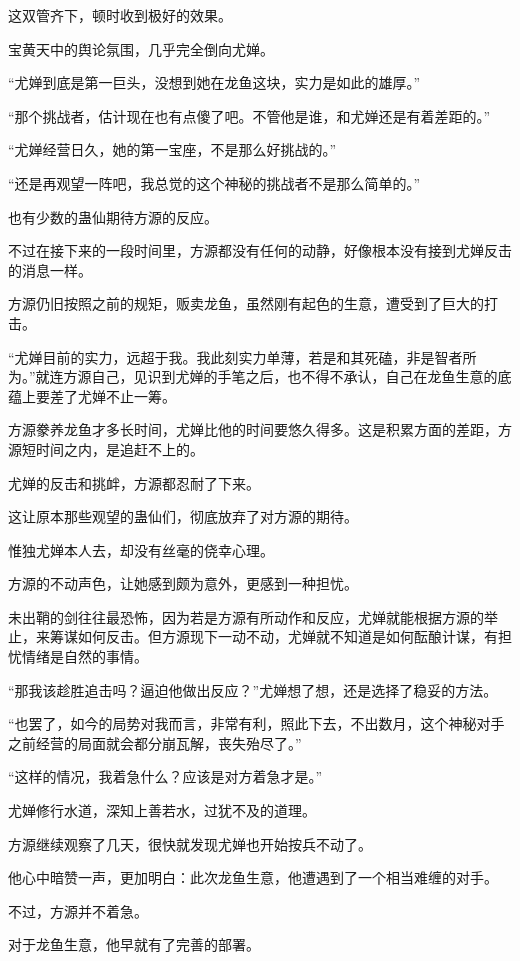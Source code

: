 \begin{this_body}
这双管齐下，顿时收到极好的效果。

宝黄天中的舆论氛围，几乎完全倒向尤婵。

“尤婵到底是第一巨头，没想到她在龙鱼这块，实力是如此的雄厚。”

“那个挑战者，估计现在也有点傻了吧。不管他是谁，和尤婵还是有着差距的。”

“尤婵经营日久，她的第一宝座，不是那么好挑战的。”

“还是再观望一阵吧，我总觉的这个神秘的挑战者不是那么简单的。”

也有少数的蛊仙期待方源的反应。

不过在接下来的一段时间里，方源都没有任何的动静，好像根本没有接到尤婵反击的消息一样。

方源仍旧按照之前的规矩，贩卖龙鱼，虽然刚有起色的生意，遭受到了巨大的打击。

“尤婵目前的实力，远超于我。我此刻实力单薄，若是和其死磕，非是智者所为。”就连方源自己，见识到尤婵的手笔之后，也不得不承认，自己在龙鱼生意的底蕴上要差了尤婵不止一筹。

方源豢养龙鱼才多长时间，尤婵比他的时间要悠久得多。这是积累方面的差距，方源短时间之内，是追赶不上的。

尤婵的反击和挑衅，方源都忍耐了下来。

这让原本那些观望的蛊仙们，彻底放弃了对方源的期待。

惟独尤婵本人去，却没有丝毫的侥幸心理。

方源的不动声色，让她感到颇为意外，更感到一种担忧。

未出鞘的剑往往最恐怖，因为若是方源有所动作和反应，尤婵就能根据方源的举止，来筹谋如何反击。但方源现下一动不动，尤婵就不知道是如何酝酿计谋，有担忧情绪是自然的事情。

“那我该趁胜追击吗？逼迫他做出反应？”尤婵想了想，还是选择了稳妥的方法。

“也罢了，如今的局势对我而言，非常有利，照此下去，不出数月，这个神秘对手之前经营的局面就会都分崩瓦解，丧失殆尽了。”

“这样的情况，我着急什么？应该是对方着急才是。”

尤婵修行水道，深知上善若水，过犹不及的道理。

方源继续观察了几天，很快就发现尤婵也开始按兵不动了。

他心中暗赞一声，更加明白：此次龙鱼生意，他遭遇到了一个相当难缠的对手。

不过，方源并不着急。

对于龙鱼生意，他早就有了完善的部署。


\end{this_body}
